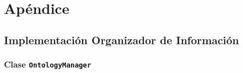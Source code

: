 \chapter*{Apéndice}
\appendix
\renewcommand{\thesection}{A.\arabic{section}}

\section{Implementación Organizador de Información}
\label{apx:impl_org_inf}

\subsection{Clase \texttt{OntologyManager}}
\label{sec:clase_ontologymanager}

